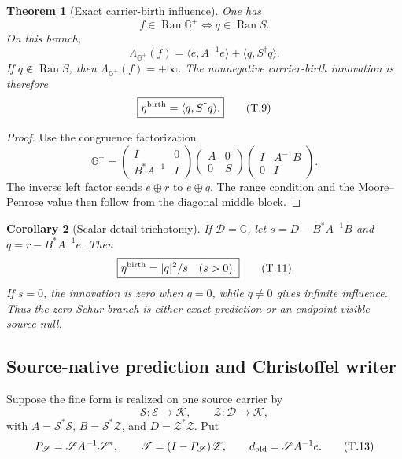\documentclass[11pt]{article}
\newtheorem{theorem}{Theorem}[section]
\newtheorem{corollary}[theorem]{Corollary}
\theoremstyle{definition}
\theoremstyle{remark}
\newcommand{\C}{\mathbb C}
\newcommand{\Ran}{\operatorname{Ran}}
\begin{document}
\begin{theorem}[Exact carrier-birth influence]
\label{thm:birth-carrier-birth}
One has
\[
 \boxed{f\in\Ran\mathbb G^+\iff q\in\Ran S.}
 \tag{T.7}
\]
On this branch,
\[
 \boxed{
 \Lambda_{\mathbb G^+}(f)
 =\langle e,A^{-1}e\rangle
  +\langle q,S^\dagger q\rangle.}
 \tag{T.8}
\]
If \(q\notin\Ran S\), then \(\Lambda_{\mathbb G^+}(f)=+\infty\).  The
nonnegative carrier-birth innovation is therefore
\[
 \boxed{\eta^{\rm birth}=\langle q,S^\dagger q\rangle.}
 \tag{T.9}
\]
\end{theorem}

\begin{proof}
Use the congruence factorization
\[
 \mathbb G^+
 =\begin{pmatrix}I&0\\B^*A^{-1}&I\end{pmatrix}
  \begin{pmatrix}A&0\\0&S\end{pmatrix}
  \begin{pmatrix}I&A^{-1}B\\0&I\end{pmatrix}.
 \tag{T.10}
\]
The inverse left factor sends \(e\oplus r\) to \(e\oplus q\).  The range
condition and the Moore--Penrose value then follow from the diagonal middle
block.
\end{proof}

\begin{corollary}[Scalar detail trichotomy]
\label{cor:birth-scalar-detail}
If \(\mathcal D=\C\), let \(s=D-B^*A^{-1}B\) and
\(q=r-B^*A^{-1}e\).  Then
\[
 \boxed{
 \eta^{\rm birth}=|q|^2/s\quad(s>0).}
 \tag{T.11}
\]
If \(s=0\), the innovation is zero when \(q=0\), while \(q\ne0\) gives
infinite influence.  Thus the zero-Schur branch is either exact prediction or
an endpoint-visible source null.
\end{corollary}

\subsection{Source-native prediction and Christoffel writer}
\label{subsec:birth-source-native}

Suppose the fine form is realized on one source carrier by
\[
 \mathscr S:\mathcal E\to\mathcal K,
 \qquad
 \mathscr Z:\mathcal D\to\mathcal K,
 \tag{T.12}
\]
with \(A=\mathscr S^*\mathscr S\),
\(B=\mathscr S^*\mathscr Z\), and \(D=\mathscr Z^*\mathscr Z\).  Put
\[
 P_{\mathscr S}=\mathscr SA^{-1}\mathscr S^*,
 \qquad
 \mathscr T=(I-P_{\mathscr S})\mathscr Z,
 \qquad
 d_{\rm old}=\mathscr SA^{-1}e.
 \tag{T.13}
\]
\end{document}
